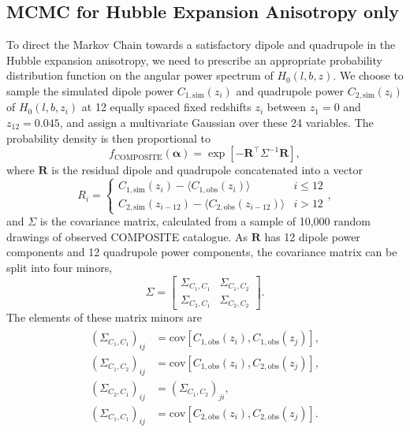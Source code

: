\documentclass[a4paper,12pt]{report}
\renewcommand{\vec}[1]{\ensuremath{\bm{#1}}}
\begin{document}
\subsection{MCMC for Hubble Expansion Anisotropy only}\label{sec: BNW Model Fitting COMPOSITE only}
To direct the Markov Chain towards a satisfactory dipole and quadrupole in the Hubble expansion anisotropy, we need to prescribe an appropriate probability distribution function on the angular power spectrum of $H_0 (l,b,z)$. We choose to sample the simulated dipole power $C_{1,\text{sim}} (z_i)$ and quadrupole power $C_{2,\text{sim}} (z_i)$ of $H_0 (l,b,z_i)$ at 12 equally spaced fixed redshifts $z_i$ between $z_1=0$ and $z_{12}=0.045$, and assign a multivariate Gaussian over these 24 variables. The probability density is then proportional to
\begin{equation}\label{eqn: COMPOSITE probability}
    f_\text{COMPOSITE}(\vec{\alpha}) = \exp\left[-\vec{R}^\intercal \Sigma^{-1} \vec{R}\right],
\end{equation}
where $\vec{R}$ is the residual dipole and quadrupole concatenated into a vector
\begin{equation}
    R_i =
    \begin{cases}
        C_{1, \text{sim}} (z_i) - \langle C_{1, \text{obs}} (z_i) \rangle & i \leq 12 \\
        C_{2, \text{sim}} (z_{i-12}) - \langle C_{2, \text{obs}} (z_{i-12}) \rangle & i > 12
    \end{cases},
\end{equation}
and $\Sigma$ is the covariance matrix, calculated from a sample of 10,000 random drawings of observed COMPOSITE catalogue. As $\vec{R}$ has 12 dipole power components and 12 quadrupole power components, the covariance matrix can be split into four minors,
\begin{equation}\label{eqn: COMPOSITE power sigma}
    \Sigma =
    \begin{bmatrix}
        \Sigma_{C_1, C_1} & \Sigma_{C_1, C_2} \\
        \Sigma_{C_2, C_1} & \Sigma_{C_2, C_2}
    \end{bmatrix}.
\end{equation}
The elements of these matrix minors are
\begin{align}
    \begin{split}\label{eqn: matrix minor expressions}
        \left(\Sigma_{C_1, C_1}\right)_{ij} &= \text{cov}\left[C_{1, \text{obs}} (z_i), C_{1, \text{obs}} (z_j)\right],\\
        \left(\Sigma_{C_1, C_2}\right)_{ij} &= \text{cov}\left[C_{1, \text{obs}} (z_i), C_{2, \text{obs}} (z_j)\right],\\
        \left(\Sigma_{C_2, C_1}\right)_{ij} &= \left(\Sigma_{C_1, C_2}\right)_{ji}, \\
        \left(\Sigma_{C_1, C_1}\right)_{ij} &= \text{cov}\left[C_{2, \text{obs}} (z_i), C_{2, \text{obs}} (z_j)\right].
    \end{split}
\end{align}
\end{document}
